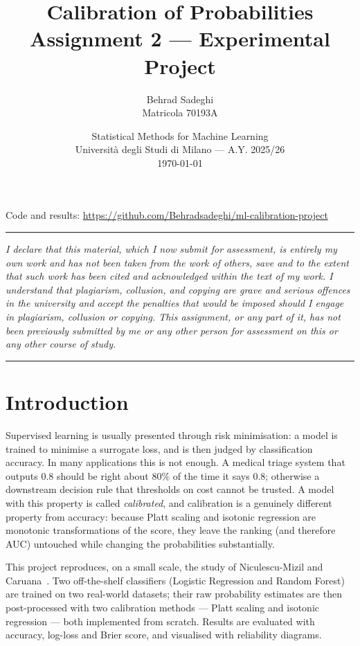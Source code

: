 \documentclass[11pt,a4paper]{article}
\title{\vspace{-1.5cm}\textbf{Calibration of Probabilities}\\[0.3em]
\large Assignment 2 --- Experimental Project}
\author{Behrad Sadeghi \\ \small Matricola 70193A}
\date{\small Statistical Methods for Machine Learning\\
Università degli Studi di Milano --- A.Y. 2025/26\\[0.5em]
\today}
\begin{document}
\maketitle

\begin{center}
\small
Code and results: \url{https://github.com/Behradsadeghi/ml-calibration-project}
\end{center}

\vspace{0.5em}
\hrule
\vspace{0.6em}

\noindent\small\textit{I declare that this material, which I now submit for assessment, is entirely my own
work and has not been taken from the work of others, save and to the extent that such work has been
cited and acknowledged within the text of my work. I understand that plagiarism, collusion, and copying
are grave and serious offences in the university and accept the penalties that would be imposed should I
engage in plagiarism, collusion or copying. This assignment, or any part of it, has not been previously
submitted by me or any other person for assessment on this or any other course of study.}
\normalsize

\vspace{0.6em}
\hrule
\vspace{1em}

\section{Introduction}

Supervised learning is usually presented through risk minimisation: a model is trained to minimise a
surrogate loss, and is then judged by classification accuracy. In many applications this is not enough.
A medical triage system that outputs $0.8$ should be right about $80\%$ of the time it says $0.8$;
otherwise a downstream decision rule that thresholds on cost cannot be trusted. A model with this
property is called \emph{calibrated}, and calibration is a genuinely different property from accuracy:
because Platt scaling and isotonic regression are monotonic transformations of the score, they leave the
ranking (and therefore AUC) untouched while changing the probabilities substantially.

This project reproduces, on a small scale, the study of Niculescu-Mizil and Caruana~\cite{nm2005}. Two
off-the-shelf classifiers (Logistic Regression and Random Forest) are trained on two real-world datasets;
their raw probability estimates are then post-processed with two calibration methods --- Platt scaling
and isotonic regression --- both implemented from scratch. Results are evaluated with accuracy, log-loss
and Brier score, and visualised with reliability diagrams.
\end{document}
